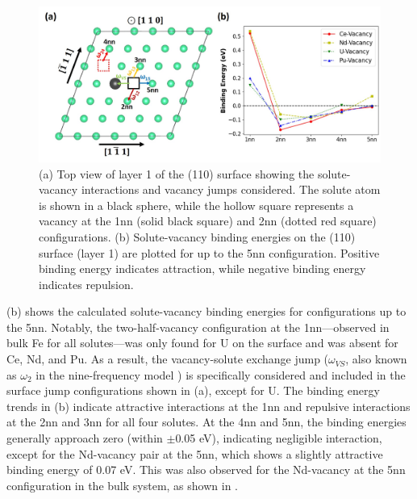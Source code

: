 \documentclass[preprint,12pt]{elsarticle}
\begin{document}
\begin{figure}[!ht]
    \centering
    \includegraphics[width=\linewidth]{bind_surface.jpg}
    \caption{(a) Top view of layer 1 of the (110) surface showing the solute-vacancy interactions and vacancy jumps considered. The solute atom is shown in a black sphere, while the hollow square represents a vacancy at the 1nn (solid black square) and 2nn (dotted red square) configurations. (b) Solute-vacancy binding energies on the (110) surface (layer 1) are plotted for up to the 5nn configuration. Positive binding energy indicates attraction, while negative binding energy indicates repulsion.}
    \label{fig:binding_mig_surface}
\end{figure}

(b) shows the calculated solute-vacancy binding energies for configurations up to the 5nn. Notably, the two-half-vacancy configuration at the 1nn—observed in bulk Fe for all solutes—was only found for U on the surface and was absent for Ce, Nd, and Pu. As a result, the vacancy-solute exchange jump ($\omega_{VS}$, also known as $\omega_2$ in the nine-frequency model \cite{leclaire1970}) is specifically considered and included in the surface jump configurations shown in (a), except for U.
The binding energy trends in (b) indicate attractive interactions at the 1nn and repulsive interactions at the 2nn and 3nn for all four solutes. At the 4nn and 5nn, the binding energies generally approach zero (within $\pm$0.05 eV), indicating negligible interaction, except for the Nd-vacancy pair at the 5nn, which shows a slightly attractive binding energy of 0.07 eV. This was also observed for the Nd-vacancy at the 5nn configuration in the bulk system, as shown in .
\end{document}
